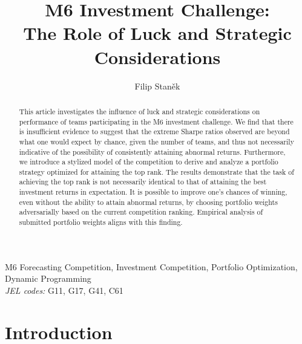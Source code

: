 \documentclass[3p,times,twocolumn]{elsarticle}
\begin{document}
\begin{frontmatter}

    \title{
        M6 Investment Challenge:\\
        The Role of Luck and Strategic Considerations
    }

    \author{
        Filip Staněk
    }
    \address{CERGE-EI}

    \dochead{}

    \begin{abstract}

        This article investigates the influence of luck and strategic considerations on performance of teams participating in the M6 investment challenge.
        We find that there is insufficient evidence to suggest that the extreme Sharpe ratios observed are beyond what one would expect by chance, given the number of teams, and thus not necessarily indicative of the possibility of consistently attaining abnormal returns. 
        Furthermore, we introduce a stylized model of the competition to derive and analyze a portfolio strategy optimized for attaining the top rank.
        The results demonstrate that the task of achieving the top rank is not necessarily identical to that of attaining the best investment returns in expectation.
        It is possible to improve one's chances of winning, even without the ability to attain abnormal returns, by choosing portfolio weights adversarially based on the current competition ranking.
        Empirical analysis of submitted portfolio weights aligns with this finding.

    \end{abstract}

    \begin{keyword}
        M6 Forecasting Competition, Investment Competition, Portfolio Optimization, Dynamic Programming\\
        \emph{JEL codes:} G11, G17, G41, C61

    \end{keyword}

\end{frontmatter}

\section{Introduction}
\end{document}
